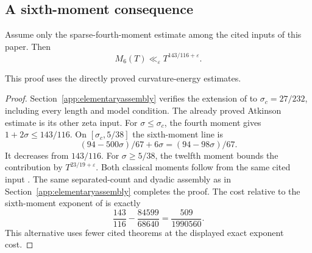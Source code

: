 \subsection{A sixth-moment consequence}
\begin{corollary}
\label{cor:curvaturesixth}
Assume only the sparse-fourth-moment estimate \cite[(\ref*{six-eq:basefourth})]{Weighted}
among the cited inputs of this paper. Then
\[
 M_6(T)\ll_\varepsilon T^{143/116+\varepsilon}.
\]
\end{corollary}
This proof uses the directly proved curvature-energy estimates.
\begin{proof}
Section~\ref{app:elementaryassembly} verifies the extension of
\cite[Proposition~\ref*{six-prop:curvatureline}]{Weighted} to $\sigma_c=27/232$,
including every length and model condition. The already proved
Atkinson estimate is its other zeta input. For $\sigma\le\sigma_c$,
the fourth moment gives $1+2\sigma\le143/116$. On
$[\sigma_c,5/38]$ the sixth-moment line is
\[
 (94-500\sigma)/67+6\sigma=(94-98\sigma)/67.
\]
It decreases from $143/116$. For $\sigma\ge5/38$, the twelfth moment
bounds the contribution by $T^{23/19+\varepsilon}$.
Both classical moments follow from the same cited input
\cite[(\ref*{six-eq:basefourth})]{Weighted}. The same separated-count and dyadic assembly
as in Section~\ref{app:elementaryassembly} completes the proof.
The cost relative to the sixth-moment exponent of \cite{Weighted} is exactly
\[
 \frac{143}{116}-\frac{84599}{68640}=\frac{509}{1990560}.
\]
This alternative uses fewer cited theorems at the displayed
exact exponent cost.
\end{proof}
